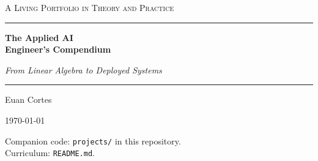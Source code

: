 \documentclass[11pt,a4paper,oneside]{book}
\begin{document}
\frontmatter
\pagestyle{empty}

\begingroup
    \thispagestyle{empty}
    \centering
    \vspace*{3cm}

    {\scshape\Large A Living Portfolio in Theory and Practice\par}
    \vspace{1.5cm}

    {\color{cmpNavy}\rule{\textwidth}{1.2pt}}
    \vspace{0.8cm}

    {\Huge\bfseries\color{cmpNavy} The Applied AI\\[0.3em] Engineer's Compendium\par}
    \vspace{0.8cm}

    {\Large\itshape From Linear Algebra to Deployed Systems\par}
    \vspace{0.6cm}

    {\color{cmpNavy}\rule{\textwidth}{1.2pt}}
    \vspace{2.5cm}

    {\Large Euan Cortes\par}
    \vspace{0.5cm}
    {\large\today\par}

    \vfill
    {\small
     Companion code: \texttt{projects/} in this repository.\\
     Curriculum: \texttt{README.md}.\par}
\endgroup
\clearpage
\pagestyle{fancy}
\tableofcontents

%
%
\mainmatter
\end{document}
